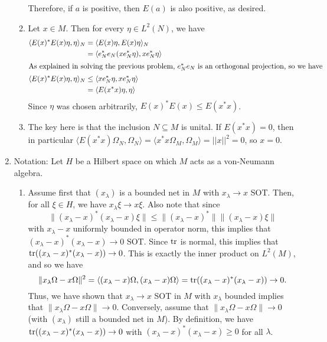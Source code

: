 \documentclass[a4paper,10pt]{report}
\newcommand{\ggen}[1]{\langle#1\rangle}
\newcommand{\norm}[1]{||#1||}
\begin{document}
\begin{enumerate}
\begin{enumerate}
				Therefore, if $a$ is positive, then $E(a)$ is also positive, as desired. 
			\item Let $x\in M$. Then for every $\eta\in L^2(N)$, we have 
				\begin{align*}
					\ggen{E(x)^*E(x)\eta,\eta}_N &= \ggen{E(x)\eta,E(x)\eta}_N\\
					&= \ggen{e_N^*e_N(xe_N^*\eta),xe_N^*\eta}\\
					\intertext{As explained in solving the previous problem, $e_N^*e_N$ is an orthogonal projection, so we have }
					\ggen{E(x)^*E(x)\eta,\eta}_N &\le \ggen{xe_N^*\eta,xe_N^*\eta}\\
					&= \ggen{E(x^*x)\eta,\eta}
				\end{align*}
				Since $\eta$ was chosen arbitrarily, $E(x)^*E(x)\le E(x^*x)$. 
			\item The key here is that the inclusion $N\subseteq M$ is unital. If $E(x^*x)=0$, then in particular $\ggen{E(x^*x)\Omega_N,\Omega_N}=\ggen{x^*x\Omega_M,\Omega_M}=\norm{x}^2=0$, so $x=0$. 
		\end{enumerate}
	\item
			Notation: Let $H$ be a Hilbert space on which $M$ acts as a von-Neumann algebra. 
		\begin{enumerate}
			\item Assume first that $(x_\lambda)$ is a bounded net in $M$ with $x_\lambda \rightarrow x$ SOT.  Then, for all $\xi\in H$, we have $x_\lambda \xi \rightarrow x\xi$.  Also note that since $$\|(x_\lambda - x)^* (x_\lambda - x)\xi \| \leq \|(x_\lambda - x)^*\| \|(x_\lambda - x)\xi \|$$ with $x_\lambda - x$ uniformly bounded in operator norm, this implies that $(x_\lambda - x)^*(x_\lambda - x) \rightarrow 0$ SOT.  Since $\operatorname{tr}$ is normal, this implies that $\operatorname{tr}((x_\lambda - x)^*(x_\lambda - x)) \rightarrow 0$.  This is exactly the inner product on $L^2(M)$, and so we have $$\|x_\lambda\Omega - x\Omega \|^2 =  \langle (x_\lambda - x)\Omega, (x_\lambda - x)\Omega \rangle = \operatorname{tr}((x_\lambda - x)^*(x_\lambda - x)) \rightarrow 0.$$ Thus, we have shown that $x_\lambda \rightarrow x$ SOT in $M$ with $x_\lambda$ bounded implies that $\|x_\lambda\Omega - x\Omega \| \rightarrow 0$.
			\newline
			\newline 
				Conversely, assume that $\|x_\lambda\Omega - x\Omega \|\rightarrow 0$ (with $(x_\lambda)$ still a bounded net in $M$).
			 By definition, we have $\operatorname{tr}((x_\lambda - x)^*(x_\lambda - x)) \rightarrow 0$ with $(x_\lambda - x)^*(x_\lambda - x) \geq 0$ for all $\lambda$. 

\end{enumerate}
\end{enumerate}
\end{document}
